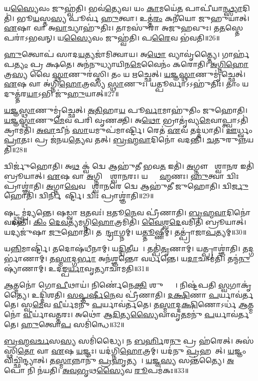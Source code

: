 𑌯\ul{𑌸𑍍𑌯𑍈}𑌵𑌂 𑌜𑍁𑌹𑍍𑌵॑𑌤𑌿।
𑌭𑌵॑\ul{𑌤𑍍𑌯𑍇}𑌵।
𑌯𑌂 \ul{𑌕𑌾}𑌮𑌯𑍇॑\ul{𑌤} 𑌪𑌾𑌪𑍀॑𑌯𑌾\ul{𑌨𑍍𑌥𑍍𑌸𑍍𑌯𑌾}𑌦𑌿𑌤𑌿॑।
𑌭𑍂\ul{𑌯}𑌸𑍍𑌤\ul{𑌸𑍍𑌯} 𑌪𑍂𑌰𑍍𑌵॑ \ul{𑌹𑍁}𑌤𑍍𑌵𑌾।
𑌉𑌤𑍍𑌤॑\ul{𑌰𑌂} 𑌕𑌨𑍀॑𑌯𑍋 𑌜𑍁𑌹𑍁𑌯𑌾𑌤𑍍।
\ul{𑌏}𑌷𑌾 𑌵𑌾 𑌅\ul{𑌵𑌾}𑌚𑍍𑌯𑌾𑌹𑍁॑𑌤𑌿𑌃।
𑌤𑌾𑌮𑌸𑍁॑𑌰𑌾 𑌅𑌜𑍁𑌹𑌵𑍁𑌃।
𑌤\ul{𑌤}𑌸𑍍𑌤𑍇 𑌪𑌰𑌾॑\-𑌽𑌭𑌵𑌨𑍍।
𑌯\ul{𑌸𑍍𑌯𑍈}𑌵𑌂 𑌜𑍁𑌹𑍍𑌵॑𑌤𑌿।
𑌪\ul{𑌰𑍈}𑌵 𑌭॑𑌵𑌤𑌿॥26॥

\ul{𑌹𑍁}𑌤𑍍𑌵𑍋𑌪॑ 𑌸𑌾𑌦\ul{𑌯}𑌤𑍍𑌯𑌜𑌾॑𑌮𑌿𑌤𑍍𑌵𑌾𑌯।
𑌅\ul{𑌥𑍋} 𑌵𑍍𑌯𑌾𑌵𑍃॑𑌤𑍍𑌤𑍍𑌯𑍈।
𑌗𑌾𑌰𑍍\mbox{}𑌹॑𑌪\ul{𑌤𑍍𑌯𑌂} 𑌪𑍍𑌰𑌤𑍀᳚𑌕𑍍𑌷𑌤𑍇।
𑌅𑌨॑𑌨𑍁𑌧𑍍𑌯𑌾𑌯𑌿𑌨\ul{𑌮𑍇}𑌵𑍈𑌨𑌂॑ 𑌕𑌰𑍋𑌤𑌿।
\ul{𑌅}\ul{𑌗𑍍𑌨𑌿}\ul{𑌹𑍋}𑌤𑍍𑌰\ul{𑌸𑍍𑌯} 𑌵𑍈 \ul{𑌸𑍍𑌥𑌾}𑌣𑍁𑌰॑𑌸𑍍𑌤𑌿।
𑌤𑌂 𑌯 \ul{𑌋}𑌚𑍍𑌛𑍇𑌤𑍍।
\ul{𑌯}\ul{𑌜𑍍𑌞}\ul{𑌸𑍍𑌥𑌾}𑌣𑍁𑌮𑍃॑𑌚𑍍𑌛𑍇𑌤𑍍।
\ul{𑌏}𑌷 𑌵𑌾 𑌅॑𑌗𑍍𑌨𑌿\ul{𑌹𑍋}𑌤𑍍𑌰𑌸𑍍𑌯॑ \ul{𑌸𑍍𑌥𑌾}𑌣𑍁𑌃।
𑌯𑌤𑍍𑌪𑍂𑌰𑍍𑌵𑌾\-𑌽𑌽𑌹𑍁॑𑌤𑌿𑌃।
𑌤𑌾𑌂 𑌯𑌦𑍁𑌤𑍍𑌤॑𑌰\ul{𑌯𑌾}𑌽𑌭𑌿 𑌜𑍁॑\ul{𑌹𑍁}𑌯𑌾𑌤𑍍॥27॥

\ul{𑌯}\ul{𑌜𑍍𑌞}\ul{𑌸𑍍𑌥𑌾}𑌣𑍁𑌮𑍃॑𑌚𑍍𑌛𑍇𑌤𑍍।
\ul{𑌅}\ul{𑌤𑌿}𑌹𑌾\ul{𑌯} 𑌪𑍂\ul{𑌰𑍍𑌵𑌾}𑌮𑌾𑌹𑍁॑𑌤𑌿𑌂 𑌜𑍁𑌹𑍋𑌤𑌿।
\ul{𑌯}\ul{𑌜𑍍𑌞}\ul{𑌸𑍍𑌥𑌾}𑌣𑍁\ul{𑌮𑍇}𑌵 𑌪𑌰𑌿॑ 𑌵𑍃𑌣𑌕𑍍𑌤𑌿।
𑌅\ul{𑌥𑍋} 𑌭𑍍𑌰𑌾𑌤𑍃॑𑌵𑍍𑌯\ul{𑌮𑍇}𑌵𑌾𑌪𑍍𑌤𑍍𑌵𑌾𑌽𑌤𑌿॑ 𑌕𑍍𑌰𑌾𑌮𑌤𑌿।
\ul{𑌅}\ul{𑌵𑌾}𑌚𑍀𑌨॑ \ul{𑌸𑌾}𑌯𑌮𑍁𑌪॑𑌮𑌾𑌰𑍍𑌷𑍍𑌟𑌿।
𑌰𑍇𑌤॑ \ul{𑌏}𑌵 𑌤𑌦𑍍𑌦॑𑌧𑌾𑌤𑌿।
\ul{𑌊}𑌰𑍍𑌧𑍍𑌵𑌂 \ul{𑌪𑍍𑌰𑌾}𑌤𑌃।
𑌪𑍍𑌰 𑌜॑𑌨𑌯\ul{𑌤𑍍𑌯𑍇}𑌵 𑌤𑌤𑍍।
\ul{𑌬𑍍𑌰}\ul{𑌹𑍍𑌮}\ul{𑌵𑌾}𑌦𑌿𑌨𑍋॑ 𑌵𑌦𑌨𑍍𑌤𑌿।
\ul{𑌚}𑌤𑍁𑌰𑍁𑌨𑍍𑌨॑𑌯𑌤𑌿॥28॥

𑌦𑍍𑌵𑌿𑌰𑍍𑌜𑍁॑𑌹𑍋𑌤𑌿।
𑌅\ul{𑌥} 𑌕𑍍𑌵॑ 𑌦𑍍𑌵𑍇 𑌆𑌹𑍁॑𑌤𑍀 𑌭𑌵\ul{𑌤} 𑌇𑌤𑌿॑।
\ul{𑌅}𑌗𑍍𑌨𑍗 𑌵𑍈᳚𑌶𑍍𑌵𑌾\ul{𑌨}𑌰 𑌇𑌤𑌿॑ 𑌬𑍍𑌰𑍂𑌯𑌾𑌤𑍍।
\ul{𑌏}𑌷 𑌵𑌾 \ul{𑌅}𑌗𑍍𑌨𑌿𑌰𑍍𑌵𑍈᳚𑌶𑍍𑌵𑌾\ul{𑌨}𑌰𑌃।
𑌯𑌦𑍍𑌬𑍍𑌰𑌾᳚\ul{𑌹𑍍𑌮}𑌣𑌃।
\ul{𑌹𑍁}𑌤𑍍𑌵𑌾 𑌦𑍍𑌵𑌿𑌃 𑌪𑍍𑌰𑌾𑌶𑍍𑌞𑌾॑𑌤𑌿।
\ul{𑌅}𑌗𑍍𑌨𑌾\ul{𑌵𑍇}𑌵 𑌵𑍈᳚𑌶𑍍𑌵𑌾\ul{𑌨}𑌰𑍇 𑌦𑍍𑌵𑍇 𑌆𑌹𑍁॑𑌤𑍀 𑌜𑍁𑌹𑍋𑌤𑌿।
𑌦𑍍𑌵𑌿\ul{𑌰𑍍𑌜𑍁}𑌹𑍋𑌤𑌿॑।
𑌦𑍍𑌵𑌿𑌰𑍍𑌨𑌿𑌮𑌾᳚𑌰𑍍𑌷𑍍𑌟𑌿।
𑌦𑍍𑌵𑌿𑌃 𑌪𑍍𑌰𑌾𑌶𑍍𑌞𑌾॑𑌤𑌿॥29॥

𑌷𑌟𑍍𑌥𑍍𑌸𑌮𑍍𑌪॑𑌦𑍍𑌯𑌨𑍍𑌤𑍇।
𑌷𑌡𑍍𑌵𑌾 \ul{𑌋}𑌤𑌵𑌃॑।
\ul{𑌋}𑌤𑍂\ul{𑌨𑍇}𑌵 𑌪𑍍𑌰𑍀॑𑌣𑌾𑌤𑌿।
\ul{𑌬𑍍𑌰}\ul{𑌹𑍍𑌮}\ul{𑌵𑌾}𑌦𑌿𑌨𑍋॑ 𑌵𑌦𑌨𑍍𑌤𑌿।
\ul{𑌕𑌿𑌂} \ul{𑌦𑍇}\ul{𑌵}𑌤𑍍𑌯॑𑌮𑌗𑍍𑌨𑌿\ul{𑌹𑍋}𑌤𑍍𑌰𑌮𑌿𑌤𑌿॑।
\ul{𑌵𑍈}\ul{𑌶𑍍𑌵}\ul{𑌦𑍇}𑌵𑌮𑌿𑌤𑌿॑ 𑌬𑍍𑌰𑍂𑌯𑌾𑌤𑍍।
𑌯𑌦𑍍𑌯𑌜𑍁॑𑌷𑌾 \ul{𑌜𑍁}𑌹𑍋𑌤𑌿॑।
𑌤𑌦𑍈᳚\ul{𑌨𑍍𑌦𑍍𑌰𑌾}𑌗𑍍𑌨𑌮𑍍।
𑌯\ul{𑌤𑍍𑌤𑍂}𑌷𑍍𑌣𑍀𑌮𑍍।
𑌤𑌤𑍍𑌪𑍍𑌰𑌾॑𑌜𑌾\ul{𑌪}𑌤𑍍𑌯𑌮𑍍॥30॥

𑌯\ul{𑌨𑍍𑌨𑌿}𑌮𑌾𑌰𑍍𑌷𑍍𑌟𑌿॑।
𑌤𑌦𑍋𑌷॑𑌧𑍀𑌨𑌾𑌮𑍍।
𑌯\ul{𑌦𑍍𑌦𑍍𑌵𑌿}𑌤𑍀𑌯𑌮𑍍᳚।
𑌤𑌤𑍍𑌪𑌿॑\ul{𑌤𑍃}𑌣𑌾𑌮𑍍।
𑌯𑌤𑍍𑌪𑍍𑌰𑌾𑌶𑍍𑌞𑌾॑𑌤𑌿।
𑌤𑌦𑍍𑌗𑌰𑍍𑌭𑌾॑𑌣𑌾𑌮𑍍।
𑌤\ul{𑌸𑍍𑌮𑌾}𑌦𑍍𑌗\ul{𑌰𑍍𑌭𑌾} 𑌅𑌨॑𑌶𑍍𑌞𑌨𑍍𑌤𑍋 𑌵𑌰𑍍𑌧𑌨𑍍𑌤𑍇।
𑌯\ul{𑌦𑌾}𑌚𑌾𑌮॑𑌤𑌿।
𑌤𑌨𑍍𑌮॑\ul{𑌨𑍁}𑌷𑍍𑌯𑌾॑𑌣𑌾𑌮𑍍।
𑌉𑌦॑𑌙𑍍𑌪\ul{𑌰𑍍𑌯𑌾}𑌵𑍃𑌤𑍍𑌯𑌾𑌚𑌾॑𑌮𑌤𑌿॥31॥

\ul{𑌆}𑌤𑍍𑌮𑌨𑍋॑ 𑌗𑍋\ul{𑌪𑍀}𑌥𑌾𑌯॑।
𑌨𑌿𑌰𑍍𑌣𑍇॑𑌨𑍇\ul{𑌕𑍍𑌤𑌿} 𑌶𑍁𑌦𑍍𑌧𑍍𑌯𑍈᳚।
𑌨𑌿𑌷𑍍𑌟॑𑌪𑌤𑌿 \ul{𑌸𑍍𑌵}𑌗𑌾𑌕𑍃॑𑌤𑍍𑌯𑍈।
𑌉𑌦𑍍𑌦𑌿॑𑌶𑌤𑌿।
\ul{𑌸}\ul{𑌪𑍍𑌤}\ul{𑌰𑍍}𑌷𑍀\ul{𑌨𑍇}𑌵 𑌪𑍍𑌰𑍀॑𑌣𑌾𑌤𑌿।
\ul{𑌦}\ul{𑌕𑍍𑌷𑌿}𑌣𑌾 \ul{𑌪}𑌰𑍍𑌯𑌾𑌵॑𑌰𑍍𑌤𑌤𑍇।
𑌸𑍍𑌵\ul{𑌮𑍇}𑌵 \ul{𑌵𑍀}𑌰𑍍𑌯॑𑌮𑌨𑍁॑ \ul{𑌪}𑌰𑍍𑌯𑌾𑌵॑𑌰𑍍𑌤𑌤𑍇।
𑌤\ul{𑌸𑍍𑌮𑌾}𑌦𑍍𑌦\ul{𑌕𑍍𑌷𑌿}𑌣𑍋\-𑌽𑌰𑍍𑌧॑ \ul{𑌆}𑌤𑍍𑌮𑌨𑍋॑ \ul{𑌵𑍀}𑌰𑍍𑌯𑌾॑𑌵𑌤𑍍𑌤𑌰𑌃।
𑌅𑌥𑍋॑ 𑌆\ul{𑌦𑌿}𑌤𑍍𑌯\ul{𑌸𑍍𑌯𑍈}𑌵𑌾𑌵𑍃\ul{𑌤}𑌮𑌨𑍁॑ \ul{𑌪}𑌰𑍍𑌯𑌾𑌵॑𑌰𑍍𑌤𑌤𑍇।
\ul{𑌹𑍁}𑌤𑍍𑌵𑍋\ul{𑌪} 𑌸𑌮𑌿॑𑌨𑍍𑌧𑍇॥32॥

\ul{𑌬𑍍𑌰}\ul{𑌹𑍍𑌮}\ul{𑌵}\ul{𑌰𑍍𑌚}𑌸\ul{𑌸𑍍𑌯} 𑌸𑌮𑌿॑𑌦𑍍𑌧𑍍𑌯𑍈।
𑌨 \ul{𑌬}\ul{𑌰𑍍}𑌹𑌿𑌰\ul{𑌨𑍁} 𑌪𑍍𑌰 𑌹॑𑌰𑍇𑌤𑍍।
𑌅𑌸॑𑌸𑍍𑌥𑌿\ul{𑌤𑍋} 𑌵𑌾 \ul{𑌏}𑌷 \ul{𑌯}𑌜𑍍𑌞𑌃।
𑌯𑌦॑𑌗𑍍𑌨𑌿\ul{𑌹𑍋}𑌤𑍍𑌰𑌮𑍍।
𑌯𑌦॑𑌨𑍁 \ul{𑌪𑍍𑌰}𑌹𑌰𑍇᳚𑌤𑍍।
\ul{𑌯}𑌜𑍍𑌞𑌂 𑌵𑌿𑌚𑍍𑌛𑌿॑𑌨𑍍𑌦𑍍𑌯𑌾𑌤𑍍।
𑌤\ul{𑌸𑍍𑌮𑌾}𑌨𑍍𑌨𑌾𑌨𑍁॑ \ul{𑌪𑍍𑌰}𑌹𑍃𑌤𑍍𑌯𑌮𑍍᳚।
\ul{𑌯}𑌜𑍍𑌞\ul{𑌸𑍍𑌯} 𑌸𑌨𑍍𑌤॑𑌤𑍍𑌯𑍈।
\ul{𑌅}𑌪𑍋 𑌨𑌿 𑌨॑𑌯𑌤𑌿।
\ul{𑌅}\ul{𑌵}\ul{𑌭𑍃}𑌥\ul{𑌸𑍍𑌯𑍈}𑌵 \ul{𑌰𑍂}𑌪𑌮॑𑌕𑌃॥33॥\anuvakamend[\ul{𑌅}\ul{𑌭}\ul{𑌵}\ul{𑌨𑍍𑌭}\ul{𑌵}\ul{𑌤𑌿} \ul{𑌜𑍁}\ul{𑌹𑍁}𑌯𑌾𑌨𑍍𑌨॑𑌯𑌤𑌿 𑌮𑌾\ul{𑌰𑍍𑌷𑍍𑌟𑌿} 𑌦𑍍𑌵𑌿𑌃 𑌪𑍍𑌰𑌾𑌶𑍍𑌞𑌾॑𑌤𑌿 𑌪𑍍𑌰𑌾𑌜𑌾\ul{𑌪}𑌤𑍍𑌯𑌮𑌾𑌚𑌾॑𑌮𑌤𑍀𑌨𑍍𑌧𑍇\-𑌽𑌕𑌃]

